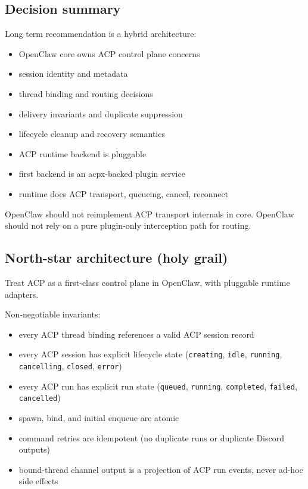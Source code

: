 \subsection{Decision summary}


Long term recommendation is a hybrid architecture:

\begin{itemize}
  \item OpenClaw core owns ACP control plane concerns
  \item session identity and metadata
  \item thread binding and routing decisions
  \item delivery invariants and duplicate suppression
  \item lifecycle cleanup and recovery semantics
  \item ACP runtime backend is pluggable
  \item first backend is an acpx-backed plugin service
  \item runtime does ACP transport, queueing, cancel, reconnect
\end{itemize}


OpenClaw should not reimplement ACP transport internals in core.
OpenClaw should not rely on a pure plugin-only interception path for routing.

\subsection{North-star architecture (holy grail)}


Treat ACP as a first-class control plane in OpenClaw, with pluggable runtime adapters.

Non-negotiable invariants:

\begin{itemize}
  \item every ACP thread binding references a valid ACP session record
  \item every ACP session has explicit lifecycle state (\texttt{creating}, \texttt{idle}, \texttt{running}, \texttt{cancelling}, \texttt{closed}, \texttt{error})
  \item every ACP run has explicit run state (\texttt{queued}, \texttt{running}, \texttt{completed}, \texttt{failed}, \texttt{cancelled})
  \item spawn, bind, and initial enqueue are atomic
  \item command retries are idempotent (no duplicate runs or duplicate Discord outputs)
  \item bound-thread channel output is a projection of ACP run events, never ad-hoc side effects
\end{itemize}


